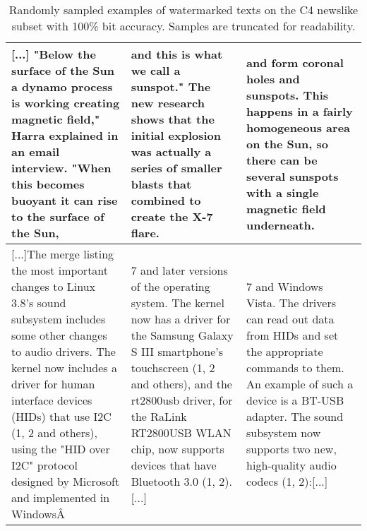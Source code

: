 \begin{table}[h]
\begin{tabular}{p{}|p{}|p{}}
[...]
"Below the surface of the Sun a dynamo process is working creating magnetic field," Harra explained in an email interview. "When this becomes buoyant it can rise to the surface of the Sun,
&
and this is what we call a sunspot."
The new research shows that the initial explosion was actually a series of smaller blasts that combined to create the X-7 flare. 
&
and form coronal holes and sunspots. This happens in a fairly homogeneous area on the Sun, so there can be several sunspots with a single magnetic field underneath. \\\hline

[...]The merge listing the most important changes to Linux 3.8's sound subsystem includes some other changes to audio drivers.
The kernel now includes a driver for human interface devices (HIDs) that use I2C (1, 2 and others), using the "HID over I2C" protocol designed by Microsoft and implemented in WindowsÂ 
&
 7 and later versions of the operating system.
The kernel now has a driver for the Samsung Galaxy S III smartphone's touchscreen (1, 2 and others), and the rt2800usb driver, for the RaLink RT2800USB WLAN chip, now supports devices that have Bluetooth 3.0 (1, 2).[...]
&
 7 and Windows Vista. The drivers can read out data from HIDs and set the appropriate commands to them. An example of such a device is a BT-USB adapter.
The sound subsystem now supports two new, high-quality audio codecs (1, 2):[...] \\ 

\bottomrule
\end{tabular}
\vspace{1em}
\caption{Randomly sampled examples of watermarked texts on the C4 newslike subset with 100\% bit accuracy. Samples are truncated for readability.}
\label{table:prompts}
\end{table}

